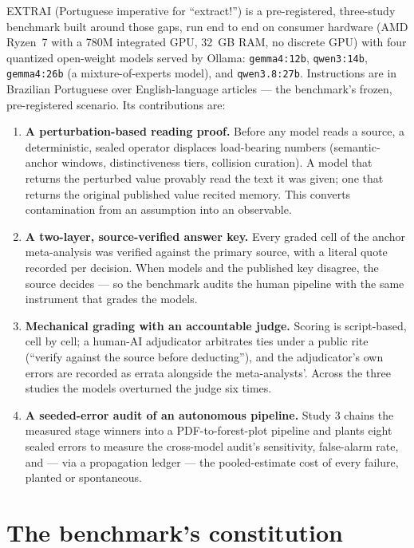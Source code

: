 \documentclass[11pt]{article}
\begin{document}
EXTRAI (Portuguese imperative for ``extract!'') is a pre-registered, three-study benchmark built around those gaps, run end to end on consumer hardware (AMD Ryzen~7 with a 780M integrated GPU, 32~GB RAM, no discrete GPU) with four quantized open-weight models served by Ollama: \texttt{gemma4:12b}, \texttt{qwen3:14b}, \texttt{gemma4:26b} (a mixture-of-experts model), and \texttt{qwen3.8:27b}. Instructions are in Brazilian Portuguese over English-language articles --- the benchmark's frozen, pre-registered scenario. Its contributions are:

\begin{enumerate}
  \item \textbf{A perturbation-based reading proof.} Before any model reads a source, a deterministic, sealed operator displaces load-bearing numbers (semantic-anchor windows, distinctiveness tiers, collision curation). A model that returns the perturbed value provably read the text it was given; one that returns the original published value recited memory. This converts contamination from an assumption into an observable.
  \item \textbf{A two-layer, source-verified answer key.} Every graded cell of the anchor meta-analysis was verified against the primary source, with a literal quote recorded per decision. When models and the published key disagree, the source decides --- so the benchmark audits the human pipeline with the same instrument that grades the models.
  \item \textbf{Mechanical grading with an accountable judge.} Scoring is script-based, cell by cell; a human-AI adjudicator arbitrates ties under a public rite (``verify against the source before deducting''), and the adjudicator's own errors are recorded as errata alongside the meta-analysts'. Across the three studies the models overturned the judge six times.
  \item \textbf{A seeded-error audit of an autonomous pipeline.} Study 3 chains the measured stage winners into a PDF-to-forest-plot pipeline and plants eight sealed errors to measure the cross-model audit's sensitivity, false-alarm rate, and --- via a propagation ledger --- the pooled-estimate cost of every failure, planted or spontaneous.
\end{enumerate}

\section{The benchmark's constitution}
\end{document}
